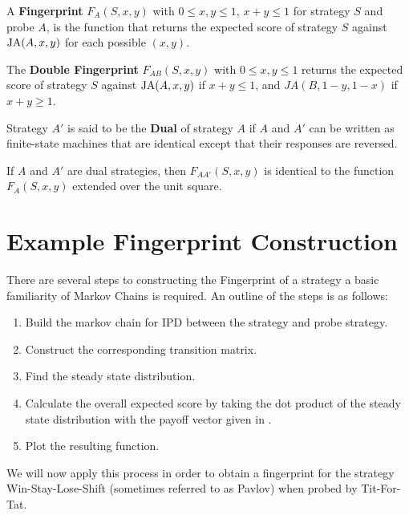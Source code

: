 \begin{definition}\label{def:fingerprint}
A \textbf{Fingerprint} $F_A(S, x, y)$ with $0 \leq x, y \leq 1$, $x+y \leq 1$ for strategy $S$ and probe $A$, is the function that returns the expected score of strategy $S$ against $\text{JA}(A, x, y)$ for each possible $(x, y)$.
\end{definition}



\begin{definition}\label{def:double-fingerprint}
The \textbf{Double Fingerprint} $F_{AB}(S, x, y)$ with $0 \leq x, y \leq 1$ returns the expected score of strategy $S$ against $\text{JA}(A, x, y)$ if $x+y \leq 1$, and $JA(B, 1-y, 1-x)$ if $x+y \geq 1$.
\end{definition}

\begin{definition}\label{def:dual}
Strategy $A'$ is said to be the \textbf{Dual} of strategy $A$ if $A$ and $A'$ can be written as finite-state machines that are identical except that their responses are reversed.
\end{definition}

\begin{theorem}\label{fingerprint-unit-square}
If $A$ and $A'$ are dual strategies, then $F_{AA'}(S, x, y)$ is identical to the function $F_A(S, x, y)$ extended over the unit square.
\end{theorem}


\section{Example Fingerprint Construction}

There are several steps to constructing the Fingerprint of a strategy a basic familiarity of Markov Chains is required.
An outline of the steps is as follows:

\begin{enumerate}
    \item Build the markov chain for IPD between the strategy and probe strategy.
    \item Construct the corresponding transition matrix.
    \item Find the steady state distribution.
    \item Calculate the overall expected score by taking the dot product of the steady state distribution with the payoff vector given in .
    \item Plot the resulting function.
\end{enumerate}
{}
We will now apply this process in order to obtain a fingerprint for the strategy Win-Stay-Lose-Shift (sometimes referred to as Pavlov) when probed by Tit-For-Tat.

